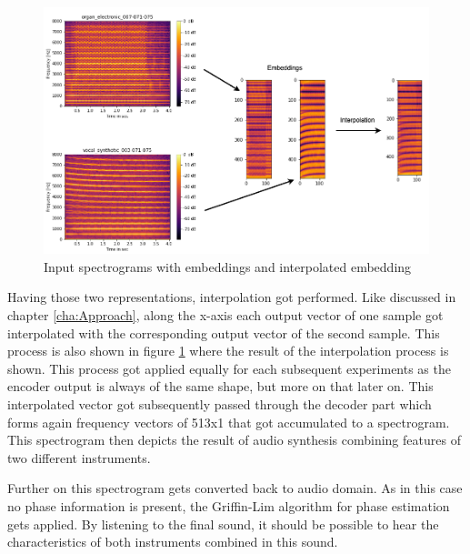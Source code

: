  \begin{figure}[htb!]
	\caption{Input spectrograms with embeddings and interpolated embedding}
	\label{fig:exp_spec_emb_int_1D}
	\centering
	\includegraphics[width=\textwidth]{images/experiments/spec_to_emb.png}
\end{figure}

Having those two representations, interpolation got performed. Like discussed in chapter \ref{cha:Approach}, along the x-axis each output vector of one sample got interpolated with the corresponding output vector of the second sample. This process is also shown in figure \ref{fig:exp_spec_emb_int_1D} where the result of the interpolation process is shown. This process got applied equally for each subsequent experiments as the encoder output is always of the same shape, but more on that later on.
This interpolated vector got subsequently passed through the decoder part which forms again frequency vectors of 513x1 that got accumulated to a spectrogram. This spectrogram then depicts the result of audio synthesis combining features of two different instruments.

Further on this spectrogram gets converted back to audio domain. As in this case no phase information is present, the Griffin-Lim algorithm \cite{Griffin1984} for phase estimation gets applied. By listening to the final sound, it should be possible to hear the characteristics of both instruments combined in this sound.

